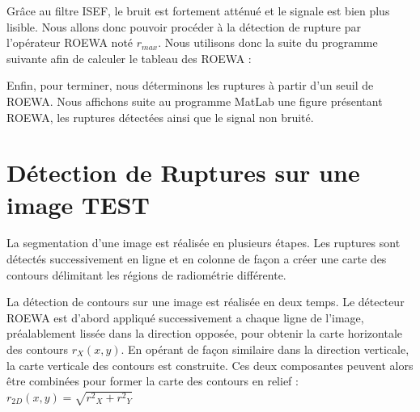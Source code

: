 \documentclass[a4paper,11pt]{article}
\newcommand{\FSource}[1]{%
  
  }
\begin{document}

Grâce au filtre ISEF, le bruit est fortement atténué et le signale est bien plus lisible. Nous allons donc pouvoir procéder à la détection de rupture par l'opérateur ROEWA noté $r_{max}$. Nous utilisons donc la suite du programme suivante afin de calculer le tableau des ROEWA :

\vspace{0.5cm}

\FSource{matlab/7.m}

\vspace{0.5cm}


Enfin, pour terminer, nous déterminons les ruptures à partir d'un seuil de ROEWA. Nous affichons suite au programme MatLab une figure présentant ROEWA, les ruptures détectées ainsi que le signal non bruité.

\vspace{0.5cm}

\FSource{matlab/8.m}

\vspace{0.5cm}


\newpage

\section{Détection de Ruptures sur une image TEST}

La segmentation d'une image est réalisée en plusieurs étapes. Les ruptures sont détectés
successivement en ligne et en colonne de façon a créer une carte des contours délimitant
les régions de radiométrie différente.

La détection de contours sur une image est réalisée en deux temps. Le détecteur
ROEWA est d'abord appliqué successivement a chaque ligne de l'image, préalablement
lissée dans la direction opposée, pour obtenir la carte horizontale des contours $r_X (x, y)$.
En opérant de façon similaire dans la direction verticale, la carte verticale des contours
est construite. Ces deux composantes peuvent alors être combinées pour former la carte
des contours en relief : $r_{2D}(x,y)=\sqrt{{r^2}_X+{r^2}_Y}$
\end{document}
